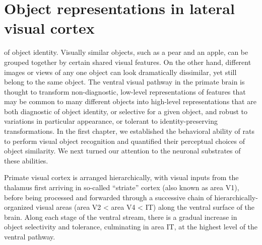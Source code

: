 
\chapter{Object representations in lateral visual cortex}
 of object identity. Visually similar objects, such as a pear and an apple, can be grouped together by certain shared visual features. On the other hand, different images or views of any one object can look dramatically dissimilar, yet still belong to the same object. The ventral visual pathway in the primate brain is thought to transform non-diagnostic, low-level representations of features that may be common to many different objects into high-level representations that are both diagnostic of object identity, or selective for a given object, and robust to variations in particular appearance, or tolerant to identity-preserving transformations. In the first chapter, we established the behavioral ability of rats to perform visual object recognition and quantified their perceptual choices of object similarity. We next turned our attention to the neuronal substrates of these abilities. 

Primate visual cortex is arranged hierarchically, with visual inputs from the thalamus first arriving in so-called ``striate'' cortex (also known as area V1), before being processed and forwarded through a successive chain of hierarchically-organized visual areas (area V2 < area V4 < IT) along the ventral surface of the brain. Along each stage of the ventral stream, there is a gradual increase in object selectivity and tolerance, culminating in area IT, at the highest level of the ventral pathway. 

